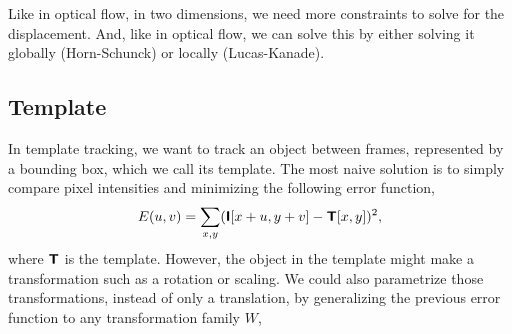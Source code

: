 Like in optical flow, in two dimensions, we need more constraints to solve for
the displacement. And, like in optical flow, we can solve this by either
solving it globally (Horn-Schunck) or locally (Lucas-Kanade).

\subsection{Template}

In template tracking, we want to track an object between frames, represented by
a bounding box, which we call its template. The most naive solution is to
simply compare pixel intensities and minimizing the following error function, \[
    E(u,v) = \sum_{x,y} (\bm{\mathsf{I}}[x+u,y+v] - \bm{\mathsf{T}}[x,y])^2,
\]
where $\bm{\mathsf{T}}$ is the template. However, the object in the template might
make a transformation such as a rotation or scaling. We could also parametrize
those transformations, instead of only a translation, by generalizing the
previous error function to any transformation family $W$,
